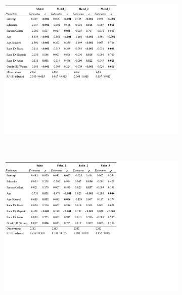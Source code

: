 \documentclass[a4paper,12pt]{extarticle}
\begin{document}
\begin{figure}[t!]
    \captionsetup[subfigure]{font=footnotesize}
    \caption{Coefficient estimates from Linear Probability Models predicting macrogenre and microgenre choices for Metal and Salsa using socio-demographic predictors.}
    \label{tab:reg}
    \centering    
     \begin{subfigure}[b]{0.9\textwidth}
        \includegraphics[trim={0 10cm 7cm 0},clip, width=1.0\textwidth]{Tabs/reg-tab-metal.png}
    \end{subfigure} \\
     \begin{subfigure}[b]{0.9\textwidth}
        \includegraphics[trim={0 10cm 7cm 0},clip, width=1.0\textwidth]{Tabs/reg-tab-salsa.png}
    \end{subfigure}
\end{figure}
    
\end{document}
